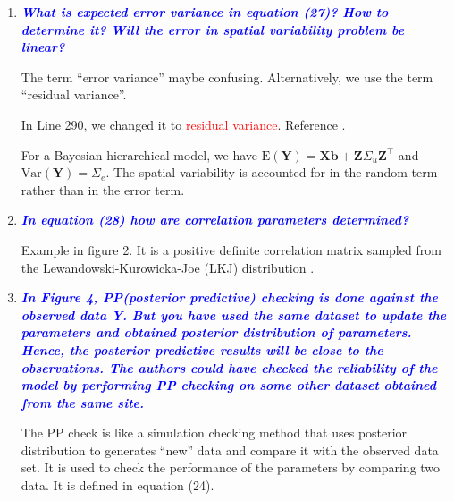 \documentclass[a4paper]{article}   	%
\newcommand{\E}{\mathrm{E}}
\newcommand{\Var}{\mathrm{Var}}
\newcommand{\qtitle}[1]{\textit{\textbf{#1}}}
\begin{document}
\begin{enumerate}
    \item \qtitle{\textcolor{blue}{What is expected error variance in equation (27)? How to determine it? Will the error in spatial variability problem be linear?}}
    
	The term ``error variance'' maybe confusing. Alternatively, we use the term ``residual variance''. 
	
	In Line 290, we changed it to \textcolor{red}{residual variance}. Reference \textcite{Gabry2019Visualization}. 
	
	For a Bayesian hierarchical model, we have $\E(\bm{Y}) = \bm{X}\bm{b} + \bm{Z}\Sigma_u\bm{Z}^\top$ and $\Var(\bm{Y}) = \Sigma_e$. The spatial variability is accounted for in the random term rather than in the error term. 
    
    \item \qtitle{\textcolor{blue}{In equation (28) how are correlation parameters determined?}}
    
    Example in figure 2. It is a positive definite correlation matrix sampled from the Lewandowski-Kurowicka-Joe (LKJ) distribution \parencite{Lewandowski2009Generating, McElreath2015Statistical}. 
    
    \item \qtitle{\textcolor{blue}{In Figure 4, PP(posterior predictive) checking is done against the observed data Y. But you have used the same dataset to update the parameters and obtained posterior distribution of parameters. Hence, the posterior predictive results will be close to the observations. The authors could have checked the reliability of the model by performing PP checking on some other dataset obtained from the same site.}}
    
    The PP check is like a simulation checking method that uses posterior distribution to generates ``new'' data and compare it with the observed data set. It is used to check the performance of the parameters by comparing two data. It is defined in equation (24). 
    
    
\end{enumerate}

\renewcommand\bibname{References}%
\printbibliography
\end{document}
